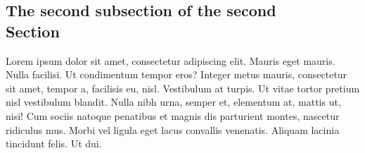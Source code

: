 \subsection{The second subsection of the second \\ Section}

Lorem ipsum dolor sit amet, consectetur adipiscing elit. Mauris eget mauris.
Nulla facilisi. Ut condimentum tempor eros? Integer metus mauris, consectetur
sit amet, tempor a, facilisis eu, nisl. Vestibulum at turpis. Ut vitae tortor
pretium nisl vestibulum blandit. Nulla nibh urna, semper et, elementum at,
mattis ut, nisi! Cum sociis natoque penatibus et magnis dis parturient montes,
nascetur ridiculus mus. Morbi vel ligula eget lacus convallis venenatis. Aliquam
lacinia tincidunt felis. Ut dui.

